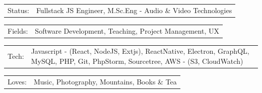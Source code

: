 \documentclass[10pt,A4]{article}
\newcommand{\tzlarrow}{(0,0) -- (0.2,0) -- (0.3,0.2) -- (0.2,0.4) -- (0,0.4) -- (0.1,0.2) -- cycle;}
\newcommand{\larrow}[1]
{\begin{tikzpicture}[scale=0.58]
	 \filldraw[fill=#1!100,draw=#1!100!black]  \tzlarrow
 \end{tikzpicture}
}
\newcommand{\cvsection}[1]
{
\colorbox{sectcol}{\mystrut \makebox[1\linewidth][l]{
\larrow{bgcol} \hspace{-8pt} \larrow{bgcol} \hspace{-8pt} \larrow{bgcol} \textcolor{white}{\textbf{#1}}\hspace{4pt}
}}\\
}
\newcommand{\metasection}[2]
{
\begin{tabular*}{1\textwidth}{p{2.4cm} p{11cm}}
\larrow{bgcol}	\normalsize{\textcolor{sectcol}{#1}}&#2\\[12pt]
\end{tabular*}
}
\newcommand{\mystrut}{\rule[-.3\baselineskip]{0pt}{\baselineskip}}
\begin{document}

\vspace{-114pt}

\metasection{Status:}{Fullstack JS Engineer, M.Sc.Eng - Audio \& Video Technologies}
\metasection{Fields:}{Software Development, Teaching, Project Management, UX}
\metasection{Tech:}{Javascript - (React, NodeJS, Extjs), ReactNative, Electron, GraphQL, MySQL, PHP, Git, PhpStorm, Sourcetree, AWS - (S3, CloudWatch)}
\metasection{Loves:}{Music, Photography, Mountains, Books \& Tea}

\vspace{6pt}




%
%
\end{document}
